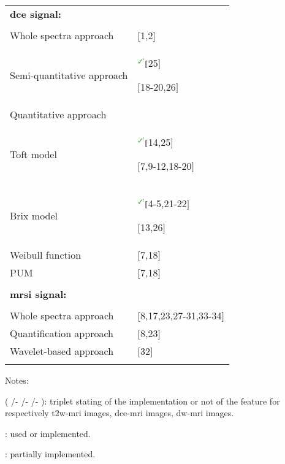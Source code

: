 \begin{table*}
\begin{threeparttable}
\begin{tabular}{p{.6\linewidth} p{.3\linewidth}}
		\textbf{\ac{dce} signal:} & \\ \\ [-1.5ex]
		\quad Whole spectra approach & $[$1,2$]$ \\
		\quad Semi-quantitative approach & $^{\text{{\mmarksmall}}}[$25$]$\par $[$18-20,26$]$ \\
		\quad Quantitative approach &  \\
		\quad \quad Toft model & $^{\text{{\mmarksmall}}}[$14,25$]$\par $[$7,9-12,18-20$]$ \\
		\quad \quad Brix model & $^{\text{{\mmarksmall}}}[$4-5,21-22$]$\par $[$13,26$]$ \\
		\quad \quad Weibull function & $[$7,18$]$ \\
		\quad \quad PUM & $[$7,18$]$ \\
		\\ [-1.5ex]
		\textbf{\ac{mrsi} signal:} & \\ \\ [-1.5ex]
		\quad Whole spectra approach & $[$8,17,23,27-31,33-34$]$ \\
		\quad Quantification approach & $[$8,23$]$ \\
		\quad Wavelet-based approach & $[$32$]$ \\ \\ [-1.5ex]
		\hline
	\end{tabular}
	\begin{tablenotes}
      \footnotesize
      \item Notes:
      \item ( {\cmarksmall}/- {\cmarksmall}/- {\cmarksmall}/- ): triplet stating of the implementation or not of the feature for respectively \ac{t2w}-\ac{mri} images, \ac{dce}-\ac{mri} images, \ac{dw}-\ac{mri} images.
      \item {\cmarksmall}: used or implemented.
      \item {\mmarksmall}: partially implemented.
    \end{tablenotes}
	\end{threeparttable}
	\label{tab:feat}
\end{table*}
\restoregeometry


